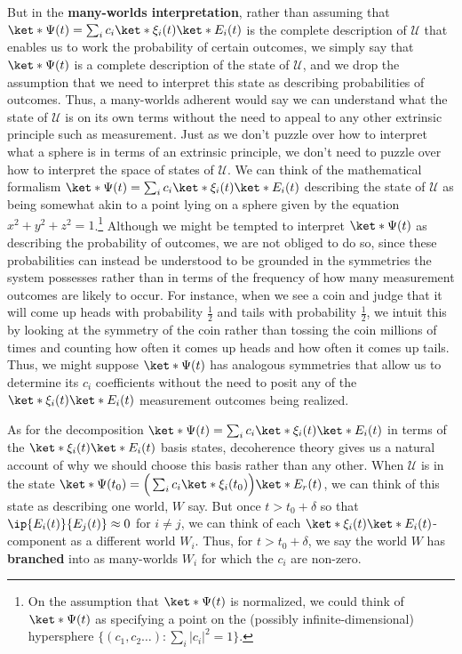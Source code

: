 \documentclass[12pt]{report}
\begin{document}
    But in the \textbf{many-worlds interpretation}, rather than assuming that $\ket*{\Psi(t)}=\sum_i c_i \ket*{\xi_i(t)}\ket*{E_i(t)}$ is the complete description of $\mathcal{U}$ that enables us to work the probability of certain outcomes, we simply say that $\ket*{\Psi(t)}$ is a complete description of the state of $\mathcal{U}$, and we drop the assumption that we need to interpret this state as describing probabilities of outcomes. Thus, a many-worlds adherent would say we can understand what the state of $\mathcal{U}$ is on its own terms without the need to appeal to any other extrinsic principle such as measurement. Just as we don't puzzle over how to interpret what a sphere is in terms of an extrinsic principle, we don't need to puzzle over how to interpret the space of states of $\mathcal{U}$. We can think of the mathematical formalism $\ket*{\Psi(t)}=\sum_i c_i \ket*{\xi_i(t)}\ket*{E_i(t)}$ describing the state of $\mathcal{U}$ as being somewhat akin to a point lying on a sphere given by the equation $x^2+y^2+z^2=1$.\footnote{On the assumption that $\ket*{\Psi(t)}$ is normalized, we could think of $\ket*{\Psi(t)}$ as specifying a point on the (possibly infinite-dimensional) hypersphere $\{(c_1,c_2\ldots):\sum_i|c_i|^2=1\}.$} Although we might be tempted to interpret $\ket*{\Psi(t)}$ as describing the probability of outcomes, we are not obliged to do so,  since these probabilities can instead be understood to be grounded in the symmetries the system possesses rather than in terms of the frequency of how many measurement outcomes are likely to occur. For instance, when we see a coin and judge that it will come up heads with probability $\frac{1}{2}$ and tails with probability $\frac{1}{2}$, we intuit this by looking at the symmetry of the coin rather than tossing the coin millions of times and counting how often it comes up heads and how often it comes up tails. Thus, we might suppose $\ket*{\Psi(t)}$ has analogous symmetries that allow us to determine its $c_i$ coefficients without the need to posit any of the $\ket*{\xi_i(t)}\ket*{E_i(t)}$ measurement outcomes being realized.
     
    As for the decomposition $\ket*{\Psi(t)}=\sum_i c_i \ket*{\xi_i(t)}\ket*{E_i(t)}$  in terms of the $\ket*{\xi_i(t)}\ket*{E_i(t)}$ basis states, decoherence theory gives us a natural account of why we should choose this basis rather than any other. When $\mathcal{U}$ is in the state $\ket*{\Psi(t_0)}=\Big(\sum_i c_i \ket*{\xi_i(t_0)}\Big)\ket*{E_r(t)}$, we can think of this state as describing one world, $W$ say.  %
%
    But once $t>t_0+\delta$ so that $\ip{E_i(t)}{E_j(t)}\approx 0$ for $i\neq j$, we can think of each $\ket*{\xi_i(t)}\ket*{E_i(t)}$-component as a different world $W_i$.   %
%
    Thus, for $t>t_0+\delta$, we say the world $W$ has \textbf{branched} into as many-worlds $W_i$ for which the $c_i$ are non-zero. 
    
\end{document}

